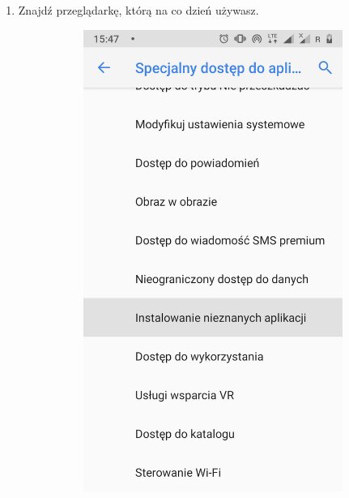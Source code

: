 \begin{enumerate}
	\item Znajdź przeglądarkę, którą na co dzień używasz.
	
	\begin{figure}[H]
		\centering
		\begin{subfigure}{0.35\textwidth}
			\centering
			\includegraphics[scale=0.14]{dodatekA/1_3.png}
			\subcaption{\label{subfigure_a}}
		\end{subfigure}
		\begin{subfigure}{0.35\textwidth}

\end{subfigure}
\end{figure}
\end{enumerate}
